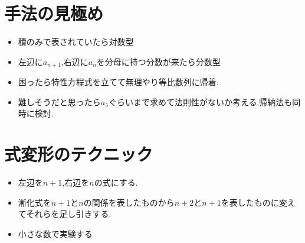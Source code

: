 \documentclass[dvipdfmx,a4paper,11pt,fleqn,openany]{jsbook}
\begin{document}
  \section{手法の見極め}
    \begin{itemize}
      \item 積のみで表されていたら対数型
      \item 左辺に$a_{n+1}$,右辺に$a_n$を分母に持つ分数が来たら分数型
      \item 困ったら特性方程式を立てて無理やり等比数列に帰着.
      \item 難しそうだと思ったら$a_5$ぐらいまで求めて法則性がないか考える.帰納法も同時に検討.
    \end{itemize}
  \section{式変形のテクニック}
    \begin{itemize}
      \item 左辺を$n+1$,右辺を$n$の式にする.
      \item 漸化式を$n+1$と$n$の関係を表したものから$n+2$と$n+1$を表したものに変えてそれらを足し引きする.
      \item 小さな数で実験する
    \end{itemize}


\end{document}
